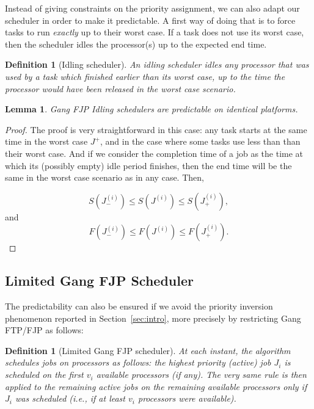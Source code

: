 \documentclass[a4paper]{article}
\newtheorem{definition}[theorem]{Definition}
\newtheorem{lemma}[theorem]{Lemma}
\begin{document}
Instead of giving constraints on the priority assignment, we can also adapt our scheduler in order to make it predictable. A first way of doing that is to force tasks to run \emph{exactly} up to their worst case. If a task does not use its worst case, then the scheduler idles the processor(s) up to the expected end time.

\begin{definition}[Idling scheduler]
An \emph{idling scheduler} idles any processor that was used by a task which finished earlier than its worst case, up to the time the processor would have been released in the worst case scenario.
\end{definition}

\begin{lemma}\label{lemma:predIdling} Gang FJP Idling schedulers are predictable on identical platforms.
\end{lemma}

\begin{proof}
The proof is very straightforward in this case: any task starts at the same time in the worst case $J^+$, and in the case where some tasks use less than than their worst case. And if we consider the completion time of a job as the time at which its (possibly empty) idle period finishes, then the end time will be the same in the worst case scenario as in any case. Then,

$$S(J^{(i)}_{-}) \leq S(J^{(i)}) \leq S(J^{(i)}_{+}),$$ 
and 
$$F(J^{(i)}_{-}) \leq F(J^{(i)}) \leq F(J^{(i)}_{+}).$$
\end{proof}


\subsection{Limited Gang FJP Scheduler}

The predictability can also be ensured if we avoid the priority inversion phenomenon reported in Section~\ref{sec:intro}, more precisely by restricting Gang FTP/FJP as follows:

\begin{definition}[Limited Gang FJP scheduler] At each instant, the algorithm schedules jobs on processors as follows: the highest priority (active) job $J_i$ is scheduled on the first $v_{i}$ available processors (if any). The very same rule is then applied to the remaining active jobs on the remaining available processors \emph{only if} $J_{i}$ was scheduled (i.e., if at least $v_{i}$ processors were available).
\end{definition}
\end{document}
